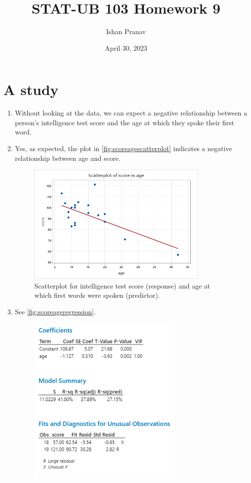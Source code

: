 \documentclass[12pt]{article}
\title{STAT-UB 103 Homework 9}
\author{Ishan Pranav}
\date{April 30, 2023}
\begin{document}
\maketitle
\section{A study}
\begin{enumerate}
\item Without looking at the data, we can expect a negative relationship between a person's intelligence test score and the age at which they spoke their first word.
\item Yes, as expected, the plot in \autoref{fig:scoreagescatterplot} indicates a negative relationship between age and score.
\begin{figure}[h]
\begin{center}
\includegraphics[width=3.5in]{src/images/score-age-scatterplot.png}
\end{center}
\caption{Scatterplot for intelligence test score (response) and age at which first words were spoken (predictor).\label{fig:scoreagescatterplot}}
\end{figure}
\item See \autoref{fig:scoreageregression}.
\begin{figure}[!h]
\begin{center}
\includegraphics[width=3in]{src/images/score-age-regression.png}

\end{center}
\end{figure}
\end{enumerate}
\end{document}
